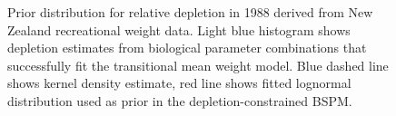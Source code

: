 \documentclass[
  11pt,
]{SCreport}
\begin{document}
\begin{figure}[H]


\caption{\label{fig-dep-prior}Prior distribution for relative depletion
in 1988 derived from New Zealand recreational weight data. Light blue
histogram shows depletion estimates from biological parameter
combinations that successfully fit the transitional mean weight model.
Blue dashed line shows kernel density estimate, red line shows fitted
lognormal distribution used as prior in the depletion-constrained BSPM.}

\end{figure}%

\newpage
\end{document}
